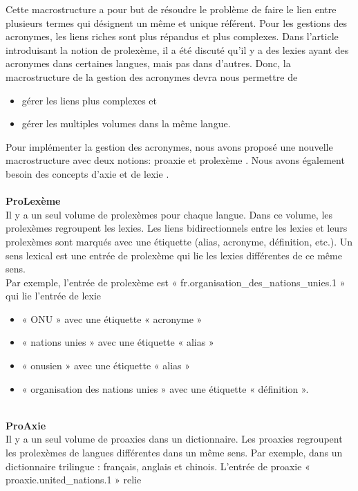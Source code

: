 \documentclass[10pt,a4paper,twoside]{article}
\begin{document}
Cette macrostructure a pour but de résoudre le problème de faire le lien entre plusieurs termes qui désignent un même et unique référent. Pour les gestions des acronymes, les liens riches sont plus répandus et plus complexes. Dans l'article introduisant la notion de prolexème, il a été discuté qu’il y a des lexies ayant des acronymes dans certaines langues, mais pas dans d'autres. Donc, la macrostructure de la gestion des acronymes devra nous permettre de  \\
\begin{itemize}
\item gérer les liens  plus complexes et
\item gérer les multiples volumes dans la même langue. 
\end{itemize}
Pour implémenter la gestion des acronymes, nous avons proposé une nouvelle macrostructure avec deux notions: proaxie et prolexème \cite{MT00}. Nous avons également besoin des concepts d'axie \cite{MTMMEP00} et de lexie \cite{MLCAPA00}. \\
\\
\textbf{ProLexème}\\
Il y a un seul volume de prolexèmes pour chaque langue. Dans ce volume, les prolexèmes regroupent les lexies. Les liens bidirectionnels entre les lexies et leurs prolexèmes sont marqués avec une étiquette (alias, acronyme, définition, etc.). Un sens lexical est une entrée de prolexème qui lie les lexies différentes de ce même sens. \\
Par exemple, l’entrée de prolexème est « fr.organisation\_des\_nations\_unies.1 » qui lie l’entrée de lexie 
\begin{itemize}
\item « ONU » avec une étiquette « acronyme »
\item « nations unies » avec une étiquette « alias »
\item « onusien » avec une étiquette « alias »
\item « organisation des nations unies » avec une étiquette « définition ».
\end{itemize}
\quad  \\
\textbf{ProAxie}\\
Il y a un seul volume de proaxies dans un dictionnaire. Les proaxies regroupent les prolexèmes de langues différentes dans un même sens. Par exemple, dans un dictionnaire trilingue : français, anglais et chinois. L’entrée de proaxie « proaxie.united\_nations.1 » relie 
\end{document}
